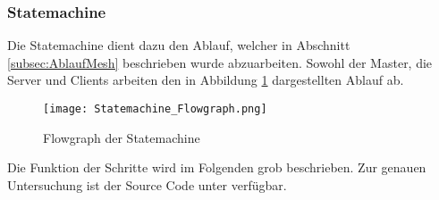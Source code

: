\subsubsection{Statemachine}\label{subsubsec:StatemachineSoftware}

Die Statemachine dient dazu den Ablauf, welcher in Abschnitt \ref{subsec:AblaufMesh} beschrieben wurde abzuarbeiten. Sowohl der Master, die Server und Clients arbeiten den in Abbildung \ref{fig:StatemachineFLowgraph} dargestellten Ablauf ab. 

\begin{figure}[H]
	\centering
	\texttt{[image: Statemachine\_Flowgraph.png]}
	\caption{Flowgraph der Statemachine}\label{fig:StatemachineFLowgraph}
\end{figure}


Die Funktion der Schritte wird im Folgenden grob beschrieben. Zur genauen Untersuchung ist der Source Code unter \cite{rouben94_sharedlib_software_git_2020} verfügbar.  \\

